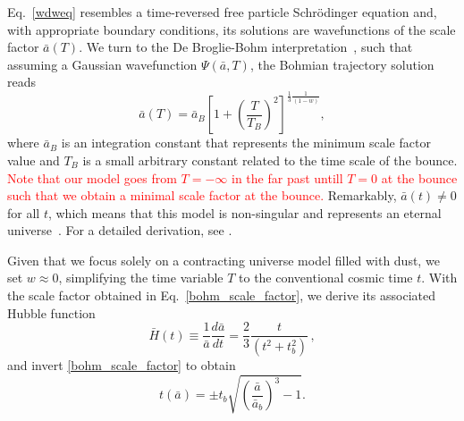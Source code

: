\documentclass[a4paper,11pt]{article}
\newcommand{\dpar}[1]{\left(#1 \right)}
\newcommand{\dcol}[1]{\left[#1 \right]}
\begin{document}
Eq.~\eqref{wdweq} resembles a time-reversed free particle Schrödinger equation and, with appropriate boundary conditions, its solutions are wavefunctions of the scale factor $\bar{a}(T)$. We turn to the De Broglie-Bohm interpretation~\cite{mukhanov2005physical,nelson2000bohm}, such that assuming a Gaussian wavefunction $\Psi(\bar{a},T)$, the Bohmian trajectory solution reads
\begin{equation}
\label{bohm_scale_factor}
            \bar{a}(T) = \bar{a}_{B}\dcol{1 + \dpar{ \frac{T}{T_{ B}} }^2 }^{{\frac{1}{3}\frac{1}{\dpar{1-w}} } }  ,
        \end{equation}
        where $\bar{a}_{B}$ is an integration constant that represents the minimum scale factor value and $T_B$ is a small arbitrary constant related to the time scale of the bounce.  \textcolor{red}{Note that our model goes from $T=-\infty$ in the far past untill $T=0$ at the bounce such that we obtain a minimal scale factor at the bounce.} Remarkably, $\bar{a}(t) \neq 0$ for all $t$, which means that this model is non-singular and represents an eternal universe~\cite{nelson_peter_bouncing_original}. For a detailed derivation, see \cite{nelson2021bouncing}.

        Given that we focus solely on a contracting universe model filled with dust, we set $w \approx 0$, simplifying the time variable $T$ to the conventional cosmic time $t$. With the scale factor obtained in Eq.~\eqref{bohm_scale_factor}, we derive its associated Hubble function
        \begin{equation}\label{bohm_hubble}
            \bar{H}(t) \equiv \frac{1}{\bar{a}}\frac{d\bar{a}}{dt} = \frac{2}{3}\frac{t}{ \dpar{ t^{2} + t^{2}_{b} } }\, ,
        \end{equation}
        and invert \eqref{bohm_scale_factor} to obtain
        \begin{equation}\label{bohm_time}
            t(\bar{a}) = \pm t_{b}\sqrt{ \dpar{\frac{\bar{a}}{\bar{a}_{b}}}^{3} - 1 } .
        \end{equation}
        
\end{document}
